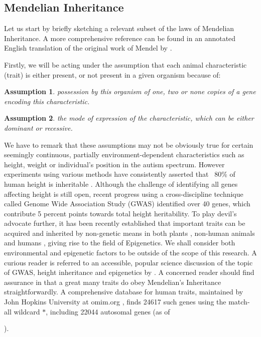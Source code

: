 \documentclass{l4proj}
\newtheorem{assum}{Assumption}
\begin{document}
\subsection{Mendelian Inheritance}

Let us start by briefly sketching a relevant subset of the laws of Mendelian Inheritance. A more comprehensive reference can be found in an annotated English translation of the original work of Mendel by \cite{mendel}.

Firstly, we will be acting under the assumption that each animal characteristic (trait) is either present, or not present in a given organism because of:
\begin{assum}\label{genotypes}
  possession by this organism of one, two or none copies of a gene encoding this characteristic.
\end{assum}

\begin{assum}\label{dominance}
  the mode of expression of the characteristic, which can be either \gls{dominant} or \gls{recessive}.
\end{assum}

We have to remark that these assumptions may not be obviously true for certain seemingly continuous, partially environment-dependent characteristics such as height, weight or individual's position in the autism spectrum. However experiments using various methods have consistently asserted that ~80\% of human height is inheritable \parencite{heightTwins, heightJustSiblings}. Although the challenge of identifying all genes affecting height is still open, recent progress using a cross-discipline technique called Genome Wide Association Study (GWAS) identified over 40 genes, which contribute 5 percent points towards total height heritability. To play devil's advocate further, it has been recently established that important traits can be acquired and inherited by non-genetic means in both plants \parencite{palmOilKernel}, non-human animals \parencite{dolinoy_maternal_2007} and humans \parencite{yehuda_holocaust_2015}, giving rise to the field of Epigenetics. We shall consider both environmental and epigenetic factors to be outside of the scope of this research. A curious reader is referred to an accessible, popular science discussion of the topic of GWAS, height inheritance and epigenetics by \textcite{GWASDiscussion}. A concerned reader should find assurance in that a great many traits do obey Mendelian's Inheritance straightforwardly. A comprehensive database for human traits, maintained by John Hopkins University at omim.org \parencite{omim16}, finds 24617 such genes using the match-all wildcard $*$, including 22044 \gls{autosomal} genes (as of \date{March 13, 2016}).
\end{document}
